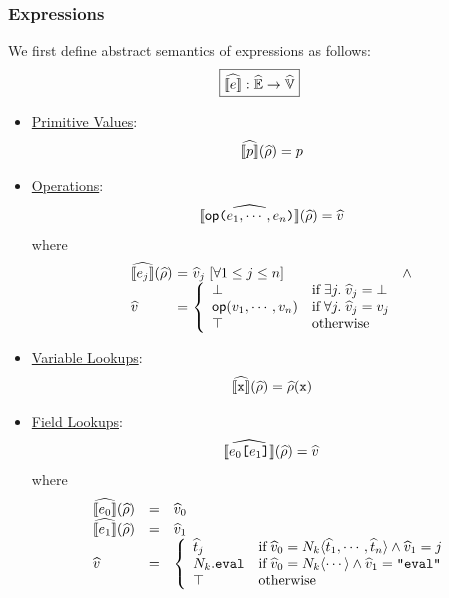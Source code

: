 \documentclass[10pt,conference]{IEEEtran}
\begin{document}
\subsubsection{Expressions} We first define abstract semantics of expressions as
follows:
\[
  \framebox{$\asem{\expr}: \aenvset \rightarrow \avalset$}
\]
\begin{itemize}
  \item \underline{Primitive Values}:
    \[
      \widehat{\llbracket{p}\rrbracket}(\widehat{\rho}) = p
    \]
  \item \underline{Operations}:
    \[
      \asem{\op \kwrl \expr_1, \cdots, \expr_n \kwrr}(\aenv) = \aval
    \]
    where
    \[
      \begin{array}{l@{~}c@{~}l@{~}l}
        \asem{\expr_j}(\aenv) &=& \aval_j \; [\forall 1 \leq j \leq n]
        &\wedge\\
        \aval &=& \left\{
          \begin{array}{ll}
            \bot & \text{if} \; \exists j. \; \aval_j = \bot\\

            \op(\val_1, \cdots, \val_n) &
            \text{if} \; \forall j. \; \aval_j = \val_j\\

            \top & \text{otherwise}\\
          \end{array}
        \right.\\
      \end{array}
    \]
  \item \underline{Variable Lookups}:
    \[
      \asem{\varx}(\aenv) = \aenv(\varx)
    \]
  \item \underline{Field Lookups}:
    \[
      \asem{\expr_0 \kwsl \expr_1 \kwsr}(\aenv) = \aval
    \]
    where
    \[
      \begin{array}{lcl}
        \asem{\expr_0}(\aenv) &=& \aval_0\\
        \asem{\expr_1}(\aenv) &=& \aval_1\\
        \aval &=& \left\{
          \begin{array}{ll}
            \atree_j & \text{if} \;
            \aval_0 = \nt_k \langle \atree_1, \cdots, \atree_n \rangle \wedge
            \aval_1 = j\\

            \nt_k.\eval & \text{if} \;
            \aval_0 = \nt_k \langle \cdots \rangle \wedge
            \aval_1 = \code{"eval"}\\

            \top & \text{otherwise}\\
          \end{array}
        \right.\\
      \end{array}
    \]
\end{itemize}
\end{document}

